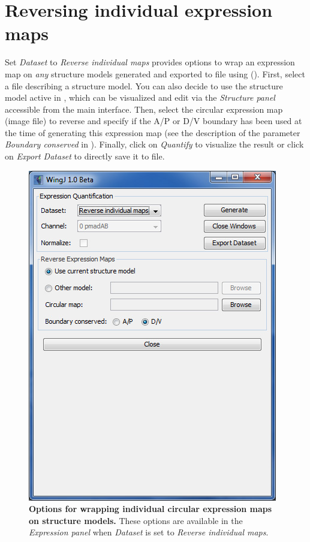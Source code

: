 \section{Reversing individual expression maps}\label{sec:expression_reversed_maps}
Set \textit{Dataset} to \textit{Reverse individual maps} provides options to wrap an expression map on \textit{any} structure models generated and exported to file using \wingj (). First, select a file describing a \wingj structure model. You can also decide to use the structure model active in \wingj, which can be visualized and edit via the \textit{Structure panel} accessible from the main interface. Then, select the circular expression map (image file) to reverse and specify if the A/P or D/V boundary has been used at the time of generating this expression map (see the description of the parameter \textit{Boundary conserved} in ). Finally, click on \textit{Quantify} to visualize the result or click on \textit{Export Dataset} to directly save it to file.

\begin{figure}[!h]
\centering
\includegraphics[scale=0.7]{images/expression_panel_3.jpg}
\caption{\textbf{Options for wrapping individual circular expression maps on structure models.} These options are available in the \textit{Expression panel} when \textit{Dataset} is set to \textit{Reverse individual maps}.}
\label{fig:wingj_expression_maps_circular_interface_reversed}
\end{figure}

